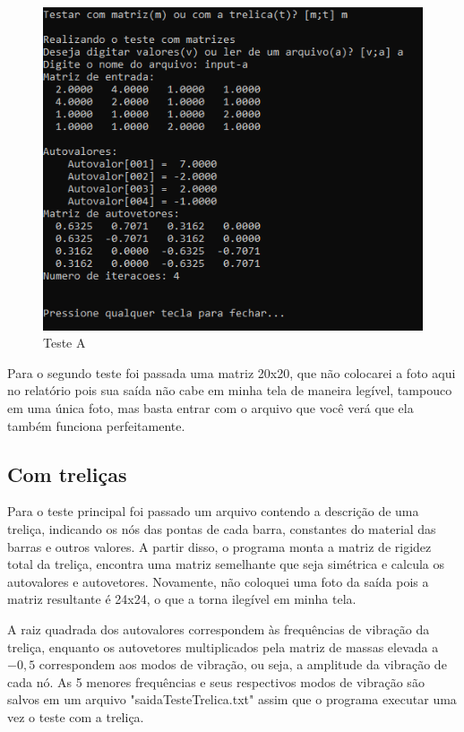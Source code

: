 \documentclass[12pt]{article} %
\begin{document}
            \begin{figure}[H]
                \centering
                \includegraphics[width=0.6\linewidth]{TesteA.png}
                \caption{Teste A}
                \label{fig:testeA}
            \end{figure}
            
            Para o segundo teste foi passada uma matriz 20x20, que não colocarei a foto aqui no relatório pois sua saída não cabe em minha tela de maneira legível, tampouco em uma única foto, mas basta entrar com o arquivo  que você verá que ela também funciona perfeitamente.
            
            \vspace{\baselineskip}
            
        \subsection{Com treliças}
            
            Para o teste principal foi passado um arquivo contendo a descrição de uma treliça, indicando os nós das pontas de cada barra, constantes do material das barras e outros valores. A partir disso, o programa monta a matriz de rigidez total da treliça, encontra uma matriz semelhante que seja simétrica e calcula os autovalores e autovetores. Novamente, não coloquei uma foto da saída pois a matriz resultante é 24x24, o que a torna ilegível em minha tela.
            
            A raiz quadrada dos autovalores correspondem às frequências de vibração da treliça, enquanto os autovetores multiplicados pela matriz de massas elevada a $-0,5$ correspondem aos modos de vibração, ou seja, a amplitude da vibração de cada nó. As 5 menores frequências e seus respectivos modos de vibração são salvos em um arquivo "saidaTesteTrelica.txt" assim que o programa executar uma vez o teste com a treliça.
            
\end{document}
